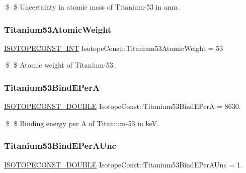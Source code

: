 \$ \$ Uncertainty in atomic mass of Titanium-\/53 in amu. \mbox{\label{group___isotope_const-_titanium-_ti53_ga2d3d6d7e4227c93fa7906b41199d2a30}} 
\subsubsection{\texorpdfstring{Titanium53\+Atomic\+Weight}{Titanium53AtomicWeight}}
{\footnotesize\ttfamily \mbox{\hyperlink{group___isotope_const-_macros_ga5f18360b3e99483a35c32d789e62621c}{I\+S\+O\+T\+O\+P\+E\+C\+O\+N\+S\+T\+\_\+\+I\+NT}} Isotope\+Const\+::\+Titanium53\+Atomic\+Weight = 53}

\$ \$ Atomic weight of Titanium-\/53. \mbox{\label{group___isotope_const-_titanium-_ti53_ga51b367cb11b99670f51187e74207b041}} 
\subsubsection{\texorpdfstring{Titanium53\+Bind\+E\+PerA}{Titanium53BindEPerA}}
{\footnotesize\ttfamily \mbox{\hyperlink{group___isotope_const-_macros_ga8f45a7272ce02c0b4c65c44636ed719a}{I\+S\+O\+T\+O\+P\+E\+C\+O\+N\+S\+T\+\_\+\+D\+O\+U\+B\+LE}} Isotope\+Const\+::\+Titanium53\+Bind\+E\+PerA = 8630.}

\$ \$ Binding energy per A of Titanium-\/53 in keV. \mbox{\label{group___isotope_const-_titanium-_ti53_ga28edb917e09a466864cf88309ebec91d}} 
\subsubsection{\texorpdfstring{Titanium53\+Bind\+E\+Per\+A\+Unc}{Titanium53BindEPerAUnc}}
{\footnotesize\ttfamily \mbox{\hyperlink{group___isotope_const-_macros_ga8f45a7272ce02c0b4c65c44636ed719a}{I\+S\+O\+T\+O\+P\+E\+C\+O\+N\+S\+T\+\_\+\+D\+O\+U\+B\+LE}} Isotope\+Const\+::\+Titanium53\+Bind\+E\+Per\+A\+Unc = 1.}

